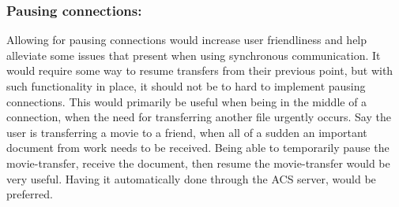 \subsubsection*{Pausing connections:}
Allowing for pausing connections would increase user friendliness and help alleviate some issues that present when using synchronous communication. It would require some way to resume transfers from their previous point, but with such functionality in place, it should not be to hard to implement pausing connections. This would primarily be useful when being in the middle of a connection, when the need for transferring another file urgently occurs. Say the user is transferring a movie to a friend, when all of a sudden an important document from work needs to be received. Being able to temporarily pause the movie-transfer, receive the document, then resume the movie-transfer would be very useful. Having it automatically done through the ACS server, would be preferred.